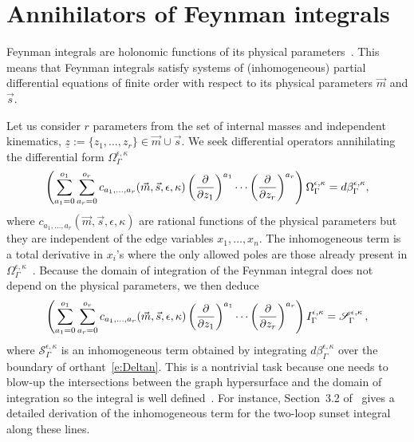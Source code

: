 \documentclass[a4paper,12pt]{article}
\numberwithin{equation}{section}
\numberwithin{figure}{section}
\begin{document}
\section{Annihilators of Feynman integrals}
\label{sec:Red}
Feynman integrals are holonomic functions of its physical parameters~\cite{Kashiwara:1977nf, Bitoun:2017nre, Smirnov:2010hn,Lee:2013hzt}. This means that Feynman integrals satisfy systems of  (inhomogeneous) partial
differential equations of finite order with respect to its physical
parameters $\vec m$ and $\vec s$.

Let us consider $r$ parameters from the set of internal masses and independent kinematics, $\underline z:=\{z_1,\dots,z_r\} \in \vec m \cup \vec s $. 
%
We seek 
differential operators 
annihilating the differential form $\Omega_\Gamma^{\epsilon,\kappa}$ 
\begin{equation}\label{e:PFOmegaGeneric}
	\left(  \sum_{a_1=0}^{o_1} \sum_{ a_r=0}^{o_r} c_{a_1,\dots,a_r}(\vec m,\vec s,\epsilon,\kappa)\left(\partial\over \partial z_1\right)^{a_1}\cdots\left(\partial
	\over\partial z_r\right)^{a_r}  \right)\Omega_\Gamma^{\epsilon,\kappa}=d\beta^{\epsilon,\kappa}_\Gamma,
\end{equation}
where $c_{a_1,\dots,a_r}(\vec m,\vec s,\epsilon,\kappa)$ are rational functions of the physical
parameters but they are independent of the edge variables $x_1,\dots,x_n$. The inhomogeneous term is a total derivative in $x_i$'s where the only allowed poles are those already present in $\Omega_\Gamma^{\epsilon,\kappa}$~\cite{Lairez:2022zkj}.
%
Because the domain of integration of the Feynman integral does not
depend on the physical parameters, we then deduce
\begin{equation}\label{e:PDEintFeynman}
	\left( \sum_{a_1=0}^{o_1} \sum_{ a_r=0}^{o_r} c_{a_1,\dots,a_r}(\vec m,\vec s,\epsilon,\kappa)\left(\partial\over \partial z_1\right)^{a_1}\cdots\left(\partial
	\over\partial z_r\right)^{a_r}  \right)I^{\epsilon,\kappa}_\Gamma=\mathscr{S}^{\epsilon,\kappa}_\Gamma \, ,
\end{equation}
where $\mathscr{S}^{\epsilon,\kappa}_\Gamma$ is an inhomogeneous term obtained by
integrating $d\beta^{\epsilon,\kappa}_\Gamma$ over the boundary of
orthant~\eqref{e:Deltan}. This is a nontrivial task because one needs
to blow-up the intersections between the graph hypersurface and the
domain of integration so the integral is well
defined~\cite{bek,Brown:2009ta,Bloch:2016izu,muller2014picard}. For
instance, 
Section~3.2 of~\cite{Bloch:2016izu} gives  a detailed derivation of the inhomogeneous term for
the two-loop sunset integral along these lines.
\end{document}
